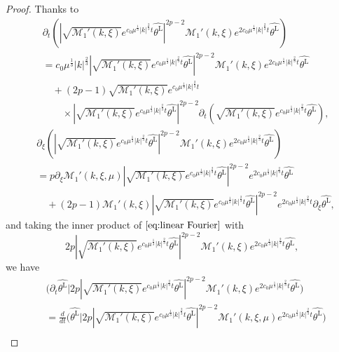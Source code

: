 \documentclass[10pt,a4paper]{amsart}
\newcommand{\lt}{\left}
\newcommand{\pt}{\partial_t}
\newcommand{\rt}{\right}
\begin{document}
\begin{proof}
		Thanks to 
		\begin{align*}
			&\pt\lt( | \sqrt{\mathcal{M}_1'(k, \xi)} e^{c_0 \mu^\frac13 |k|^\frac23 t} \widehat{\theta^{\mathrm{L}} }|^{2p-2} \mathcal{M}_1'(k, \xi) e^{2c_0 \mu^\frac13 |k|^\frac23 t} \widehat{\theta^{\mathrm{L}} } \rt) \\
			&=c_0\mu^\frac13 |k|^\frac23 | \sqrt{\mathcal{M}_1'(k, \xi)} e^{c_0 \mu^\frac13 |k|^\frac23 t} \widehat{\theta^{\mathrm{L}} }|^{2p-2}  \mathcal{M}_1'(k, \xi) e^{2c_0 \mu^\frac13 |k|^\frac23 t} \widehat{\theta^{\mathrm{L}} }\\
			& \quad + (2p-1) \sqrt{\mathcal{M}_1'(k, \xi)} e^{c_0 \mu^\frac13 |k|^\frac23 t} \\
			&\qquad \times | \sqrt{\mathcal{M}_1'(k, \xi)} e^{c_0 \mu^\frac13 |k|^\frac23 t} \widehat{\theta^{\mathrm{L}} }|^{2p-2} \pt( \sqrt{\mathcal{M}_1'(k, \xi)} e^{c_0 \mu^\frac13 |k|^\frac23 t} \widehat{\theta^{\mathrm{L}} }),
		\end{align*}
		\begin{align*}
			&\partial_\xi \lt( | \sqrt{\mathcal{M}_1'(k, \xi)} e^{c_0 \mu^\frac13 |k|^\frac23 t} \widehat{\theta^{\mathrm{L}} }|^{2p-2} \mathcal{M}_1'(k, \xi) e^{2c_0 \mu^\frac13 |k|^\frac23 t} \widehat{\theta^{\mathrm{L}} } \rt) \\
			&=  p \partial_\xi  \mathcal{M}_1'(k, \xi, \mu)  | \sqrt{\mathcal{M}_1'(k, \xi)} e^{c_0 \mu^\frac13 |k|^\frac23 t} \widehat{\theta^{\mathrm{L}} }|^{2p-2}    e^{2c_0 \mu^\frac13 |k|^\frac23 t} \widehat{\theta^{\mathrm{L}} }\\
			& \quad + (2p-1) \mathcal{M}_1'(k, \xi)  | \sqrt{\mathcal{M}_1'(k, \xi)} e^{c_0 \mu^\frac13 |k|^\frac23 t} \widehat{\theta^{\mathrm{L}} }|^{2p-2}   e^{2c_0 \mu^\frac13 |k|^\frac23 t}    \partial_\xi\widehat{\theta^{\mathrm{L}} },
		\end{align*}
		and taking the inner product of $\eqref{eq:linear Fourier}$ with $$2p | \sqrt{\mathcal{M}_1'(k, \xi)} e^{c_0 \mu^\frac13 |k|^\frac23 t} \widehat{\theta^{\mathrm{L}} }|^{2p-2} \mathcal{M}_1'(k, \xi) e^{2c_0 \mu^\frac13 |k|^\frac23 t} \widehat{\theta^{\mathrm{L}} },$$ we have
		\begin{align*}
			&\big( \pt \widehat{\theta^{\mathrm{L}}} \big| 2p | \sqrt{\mathcal{M}_1'(k, \xi)} e^{c_0 \mu^\frac13 |k|^\frac23 t} \widehat{\theta^{\mathrm{L}} }|^{2p-2} \mathcal{M}_1'(k, \xi) e^{2c_0 \mu^\frac13 |k|^\frac23 t} \widehat{\theta^{\mathrm{L}} } \big) \\
			&= \frac{d}{dt} \big(  \widehat{\theta^{\mathrm{L}}} \big| 2p | \sqrt{\mathcal{M}_1'(k, \xi)} e^{c_0 \mu^\frac13 |k|^\frac23 t} \widehat{\theta^{\mathrm{L}} }|^{2p-2} \mathcal{M}_1'(k, \xi, \mu) e^{2c_0 \mu^\frac13 |k|^\frac23 t} \widehat{\theta^{\mathrm{L}} } \big) \\

\end{align*}
\end{proof}
\end{document}

